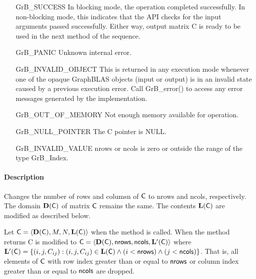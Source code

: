 \begin{itemize}[leftmargin=2.1in]
    \item[{\sf GrB\_SUCCESS}]         In blocking mode, the operation completed
    successfully. In non-blocking mode, this indicates that the API checks 
    for the input arguments passed successfully. Either way, output matrix 
    {\sf C} is ready to be used in the next method of the sequence.

    \item[{\sf GrB\_PANIC}]           Unknown internal error.
    
    \item[{\sf GrB\_INVALID\_OBJECT}] This is returned in any execution mode 
    whenever one of the opaque GraphBLAS objects (input or output) is in an invalid 
    state caused by a previous execution error.  Call {\sf GrB\_error()} to access 
    any error messages generated by the implementation.

    \item[{\sf GrB\_OUT\_OF\_MEMORY}] Not enough memory available for operation.
    
    \item[{\sf GrB\_NULL\_POINTER}]  The {\sf C} pointer is {\sf NULL}.
    
    \item[{\sf GrB\_INVALID\_VALUE}] {\sf nrows} or {\sf ncols} is zero or outside the range of the type {\sf GrB\_Index}.
\end{itemize}

\paragraph{Description}

Changes the number of rows and columsn of ${\sf C}$ to {\sf nrows} and {\sf ncols}, respectively. The domain
$\mathbf{D}({\sf C})$ of matrix ${\sf C}$ remains the same. The
contents $\mathbf{L}({\sf C})$ are modified as described below.

Let ${\sf C} = \langle \mathbf{D}({\sf C}), M, N, \mathbf{L}({\sf C})
\rangle$ when the method is called. When the method returns {\sf C} is modified to ${\sf C}
= \langle \mathbf{D}({\sf C}), {\sf nrows}, {\sf ncols}, \mathbf{L'}({\sf C})
\rangle$ where $\mathbf{L'}({\sf C}) = \{(i,j,C_{ij}) : (i,j,C_{ij}) \in
\mathbf{L}({\sf C}) \wedge (i < {\sf nrows}) \wedge (j < {\sf ncols})\}$. That is, all elements
of ${\sf C}$ with row index greater than or equal to 
${\sf nrows}$ or column index greater than or equal to ${\sf ncols}$ are dropped.

